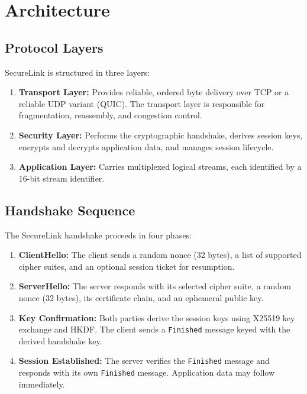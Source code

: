 \documentclass[
    language=english,
    doctype=article,
    institution=none,
]{../../omnilatex}
\begin{document}
\section{Architecture}

\subsection{Protocol Layers}

SecureLink is structured in three layers:

\begin{enumerate}
    \item \textbf{Transport Layer:} Provides reliable, ordered byte delivery
          over TCP or a reliable UDP variant (QUIC).  The transport layer is
          responsible for fragmentation, reassembly, and congestion control.
    \item \textbf{Security Layer:} Performs the cryptographic handshake,
          derives session keys, encrypts and decrypts application data, and
          manages session lifecycle.
    \item \textbf{Application Layer:} Carries multiplexed logical streams,
          each identified by a 16-bit stream identifier.
\end{enumerate}

\subsection{Handshake Sequence}

The SecureLink handshake proceeds in four phases:

\begin{enumerate}
    \item \textbf{ClientHello:} The client sends a random nonce (32 bytes),
          a list of supported cipher suites, and an optional session ticket
          for resumption.
    \item \textbf{ServerHello:} The server responds with its selected cipher
          suite, a random nonce (32 bytes), its certificate chain, and an
          ephemeral public key.
    \item \textbf{Key Confirmation:} Both parties derive the session keys
          using X25519 key exchange and HKDF.  The client sends a
          \texttt{Finished} message keyed with the derived handshake key.
    \item \textbf{Session Established:} The server verifies the
          \texttt{Finished} message and responds with its own
          \texttt{Finished} message.  Application data may follow immediately.
\end{enumerate}
\end{document}
